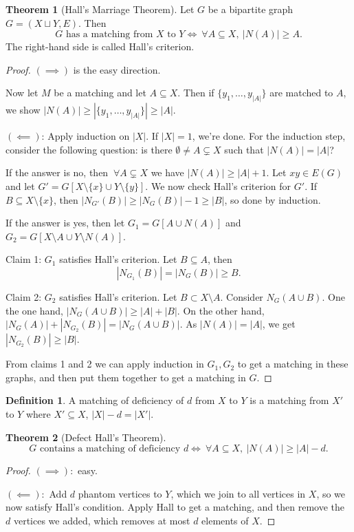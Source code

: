 \documentclass{article}
\theoremstyle{definition}
\newtheorem{theorem}{Theorem}[section]
\newtheorem{defn}{Definition}[section]
\begin{document}
\begin{theorem}[Hall's Marriage Theorem]
    Let $G$ be a bipartite graph $G = (X \sqcup Y, E)$. Then
    \[
    G \text{ has a matching from }X \text{ to }Y \iff ~\forall A \subseteq X, ~|N(A)|\ge A.
    \]
    The right-hand side is called Hall's criterion.
\end{theorem}
\begin{proof}
    $(\implies)$ is the easy direction.

    Now let $M$ be a matching and let $A \subseteq X$. Then if $\{y_1,\ldots,y_{|A|}\}$ are matched to $A$, we show $|N(A)| \ge  |\{y_1,\ldots,y_{|A|}\}| \ge |A|$.

    $(\impliedby)$: Apply induction on $|X|$. If $|X|=1$, we're done. For the induction step, consider the following question: is there $\emptyset \neq A \subsetneq X$ such that $|N(A)|=|A|$? 
    \vspace{1mm}
    
    If the answer is no, then $~\forall A \subsetneq X$ we have $|N(A)| \ge |A| + 1$. Let $xy \in E(G)$ and let $G' = G[X\setminus \{x\} \cup Y\setminus \{y\}]$. We now check Hall's criterion for $G'$. If $B \subseteq X\setminus \{x\}$, then $|N_{G'}(B)| \ge |N_G(B)|-1 \ge |B|$, so done by induction.
    \vspace{1mm}
    
    If the answer is yes, then let $G_1 = G[A \cup N(A)]$ and $G_2 = G[X\setminus A \cup Y\setminus N(A)]$. 
    
    Claim 1: $G_1$ satisfies Hall's criterion. Let $B \subseteq A$, then $$|N_{G_1}(B)| = |N_G(B)| \ge B.$$

    Claim 2: $G_2$ satisfies Hall's criterion. Let $B \subset X\setminus A.$ Consider $N_G(A \cup B)$. One the one hand, $|N_G(A \cup B)| \ge |A| + |B|$. On the other hand, $|N_G(A)| + |N_{G_2}(B)| = |N_G(A \cup B)|$. As $|N(A)|=|A|$, we get $|N_{G_2}(B)| \ge |B|$.

    From claims 1 and 2 we can apply induction in $G_1,G_2$ to get a matching in these graphs, and then put them together to get a matching in $G$.
\end{proof}
\begin{defn}
    A matching of deficiency of $d$ from $X$ to $Y$ is a matching from $X'$ to $Y$ where $X' \subseteq X$, $|X|-d = |X'|$.
\end{defn}
\begin{theorem}[Defect Hall's Theorem]
    \[
    G \text{ contains a matching of deficiency }d \iff ~\forall A \subseteq X,~ |N(A)| \ge |A| - d.
    \]
\end{theorem}
\begin{proof}
    $(\implies ):$ easy.
    
    $(\impliedby):$ Add $d$ phantom vertices to $Y$, which we join to all vertices in $X$, so we now satisfy Hall's condition. Apply Hall to get a matching, and then remove the $d$ vertices we added, which removes at most $d$ elements of $X$.
\end{proof}
\end{document}
